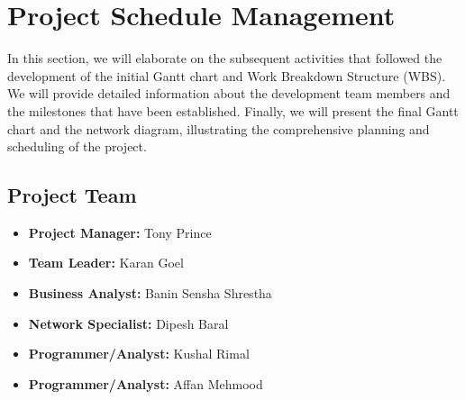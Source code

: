 \chapter{Project Schedule Management}
In this section, we will elaborate on the subsequent activities that followed the development of the initial Gantt chart and Work Breakdown Structure (WBS). We will provide detailed information about the development team members and the milestones that have been established. Finally, we will present the final Gantt chart and the network diagram, illustrating the comprehensive planning and scheduling of the project.


\section{Project Team}
\begin{itemize}
    \item \textbf{Project Manager:} Tony Prince
    \item \textbf{Team Leader:} Karan Goel
    \item \textbf{Business Analyst:} Banin Sensha Shrestha
    \item \textbf{Network Specialist:} Dipesh Baral
    \item \textbf{Programmer/Analyst:} Kushal Rimal
    \item \textbf{Programmer/Analyst:} Affan Mehmood
\end{itemize}

